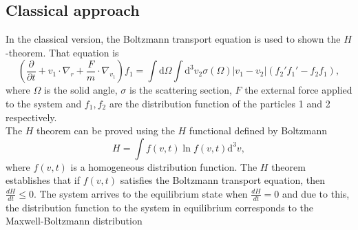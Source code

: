 \documentclass{article}
\begin{document}
\subsection{Classical approach}
In the classical version, the Boltzmann transport equation is used to shown the $H$-theorem. That equation is
\begin{equation}
    \left( \frac{\partial }{\partial t}+v_1 \cdot \nabla_r +\frac{F}{m} \cdot \nabla_{v_1} \right)f_1=\int \mathrm{d}\Omega \int \mathrm{d}^{3}v_2\sigma(\Omega)|v_1-v_2|(f_2'f_1'-f_2f_1),
\end{equation}
where $\Omega$ is the solid angle, $\sigma$ is the scattering section, $F$ the external force applied to the system and $f_1, f_2$ are the distribution function of the particles 1 and 2 respectively.\\
The $H$ theorem can be proved using the $H$ functional defined by Boltzmann 
\begin{equation}
    H=\int f(v,t) \ln f(v,t) \mathrm{d}^{3}v,
\end{equation} \label{hfunctional}
where $f(v,t)$ is a homogeneous distribution function. The $H$ theorem establishes that if $f(v,t)$ satisfies the Boltzmann transport equation, then $\frac{dH}{dt}\leq 0$. The system arrives to the equilibrium state when $\frac{dH}{dt}=0$ and due to this, the distribution function to the system in equilibrium corresponds to the Maxwell-Boltzmann distribution
\end{document}
